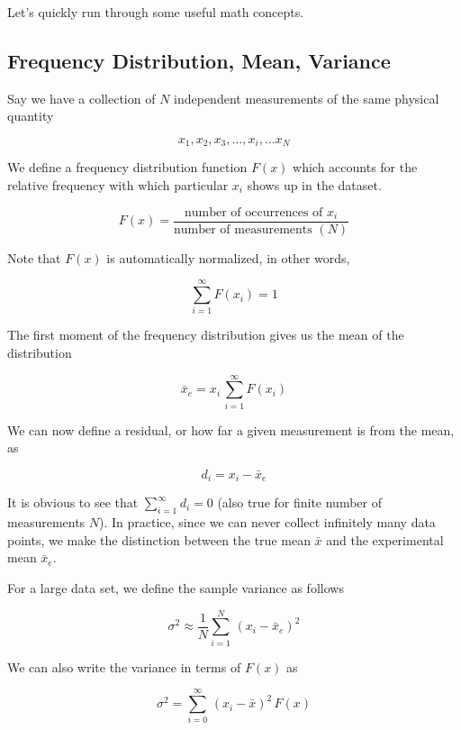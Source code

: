 \documentclass{article}
\begin{document}
Let's quickly run through some useful math concepts.

\subsection{Frequency Distribution, Mean, Variance}


Say we have a collection of $N$ independent measurements of the same physical quantity

\[x_1,x_2,x_3, \dots, x_i, \dots x_N\]

We define a frequency distribution function $F(x)$ which accounts for the relative frequency with which particular $x_i$ shows up in the dataset.

\[F(x) = \frac{\text{number of occurrences of $x_i$}}{\text{number of measurements } (N)} \]

Note that $F(x)$ is automatically normalized, in other words, 

\[\sum_{i=1}^{\infty} F(x_i) = 1\]

The first moment of the frequency distribution gives us the mean of the distribution

\begin{equation}\label{eqn:mean_from_fd}
    \bar{x}_e = x_i \, \sum_{i=1}^{\infty} F(x_i)
\end{equation}

We can now define a residual, or how far a given measurement is from the mean, as 

\[d_i = x_i - \bar{x}_e\]

It is obvious to see that $\sum_{i=1}^{\infty} d_i = 0$ (also true for finite number of measurements $N$). In practice, since we can never collect infinitely many data points, 
we make the distinction between the true mean $\bar{x}$ and the experimental mean $\bar{x}_e$. 

For a large data set, we define the sample variance as follows

\begin{equation}\label{eqn:variance}
    \sigma^2 \approx \frac{1}{N} \sum_{i=1}^{N} \, (x_i - \bar{x}_e)^2 
\end{equation}

We can also write the variance in terms of $F(x)$ as

\begin{equation}\label{eqn:variance_from_fd}
    \sigma^2 = \sum_{i=0}^{\infty} \, (x_i - \bar{x})^2 \, F(x) 
\end{equation}
\end{document}
